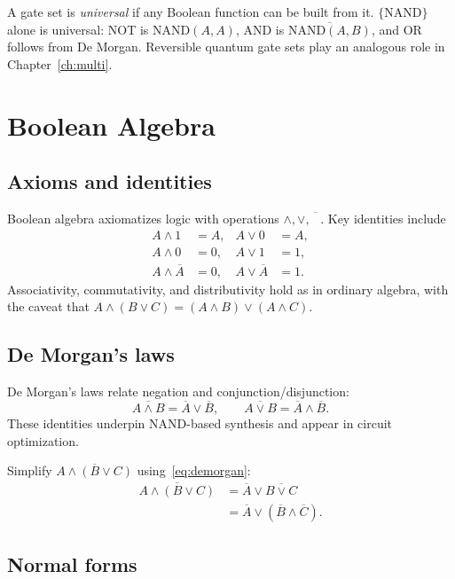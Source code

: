 A gate set is \emph{universal} if any Boolean function can be built from it. $\{\mathrm{NAND}\}$ alone is universal: NOT is $\mathrm{NAND}(A,A)$, AND is $\overline{\mathrm{NAND}(A,B)}$, and OR follows from De Morgan. Reversible quantum gate sets play an analogous role in Chapter~\ref{ch:multi}.

\section{Boolean Algebra}
\label{sec:boolean}

\subsection{Axioms and identities}

Boolean algebra axiomatizes logic with operations $\land,\lor,\overline{\phantom{A}}$. Key identities include
\begin{align}
A \land 1 &= A, & A \lor 0 &= A, \\
A \land 0 &= 0, & A \lor 1 &= 1, \\
A \land \overline{A} &= 0, & A \lor \overline{A} &= 1.
\end{align}
Associativity, commutativity, and distributivity hold as in ordinary algebra, with the caveat that $A\land(B\lor C)=(A\land B)\lor(A\land C)$.

\subsection{De Morgan's laws}

De Morgan's laws relate negation and conjunction/disjunction:
\begin{equation}
\overline{A\land B} = \overline{A}\lor\overline{B},\qquad
\overline{A\lor B} = \overline{A}\land\overline{B}.
\label{eq:demorgan}
\end{equation}
These identities underpin NAND-based synthesis and appear in circuit optimization.

\begin{example}
Simplify $\overline{A\land(B\lor C)}$ using~\eqref{eq:demorgan}:
\begin{align*}
\overline{A\land(B\lor C)} &= \overline{A}\lor\overline{B\lor C} \\
&= \overline{A}\lor(\overline{B}\land\overline{C}).
\end{align*}
\end{example}

\subsection{Normal forms}

